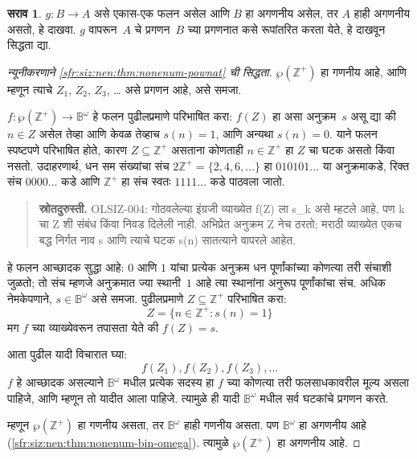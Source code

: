\documentclass[11pt,a4paper,openany]{book}
\theoremstyle{definition}
\newtheorem{prob}{सराव}[chapter]
\newcommand{\Setabs}[2]{\{#1:#2\}}
\newcommand{\Pow}[1]{\wp(#1)}
\newcommand{\PosInt}{\mathbb{Z}^{+}}
\newcommand{\Bin}{\mathbb{B}}
\begin{document}
\begin{prob}
$g\colon B \to A$ असे एकास-एक फलन असेल आणि $B$ हा
अगणनीय असेल, तर $A$ हाही अगणनीय असतो, हे दाखवा.
$g$ वापरून~$A$ चे प्रगणन~$B$ च्या प्रगणनात कसे रूपांतरित करता येते,
हे दाखवून सिद्धता द्या.
\end{prob}

\begin{proof}[न्यूनीकरणाने {\ref{sfr:siz:nen:thm:nonenum-pownat}} ची सिद्धता]
$\Pow{\PosInt}$ हा गणनीय आहे, आणि म्हणून त्याचे $Z_{1}$,
$Z_{2}$, $Z_{3}$, \dots{} असे प्रगणन आहे, असे समजा.

$f \colon \Pow{\PosInt} \to \Bin^\omega$ हे फलन पुढीलप्रमाणे परिभाषित
करा: $f(Z)$ हा असा अनुक्रम~$s$ असू द्या की $n \in Z$ असेल तेव्हा
आणि केवळ तेव्हाच $s(n) = 1$, आणि अन्यथा $s(n) = 0$. याने
फलन स्पष्टपणे परिभाषित होते, कारण $Z \subseteq \PosInt$ असताना कोणताही
$n \in \PosInt$ हा $Z$ चा घटक असतो किंवा नसतो. उदाहरणार्थ, धन सम संख्यांचा संच
$2\PosInt = \{2, 4, 6, \dots\}$ हा $010101\dots$ या अनुक्रमाकडे,
रिक्त संच $0000\dots$ कडे आणि $\PosInt$ हा संच स्वतः $1111\dots$ कडे
पाठवला जातो.
\begin{quote}\small\textbf{स्रोतदुरुस्ती.} OLSIZ-004: गोठवलेल्या इंग्रजी व्याख्येत f(Z) ला s\_k असे म्हटले आहे, पण k चा Z शी संबंध किंवा निवड दिलेली नाही. अभिप्रेत अनुक्रम Z नेच ठरतो; मराठी व्याख्येत एकच बद्ध निर्गत नाव s आणि त्याचे घटक s(n) सातत्याने वापरले आहेत.\end{quote}

हे फलन आच्छादक सुद्धा आहे: $0$ आणि $1$ यांचा प्रत्येक अनुक्रम धन
पूर्णांकांच्या कोणत्या तरी संचाशी जुळतो; तो संच म्हणजे अनुक्रमात ज्या
स्थानी~$1$ आहे त्या स्थानांना अनुरूप पूर्णांकांचा संच. अधिक नेमकेपणाने,
$s \in \Bin^\omega$ असे समजा. पुढीलप्रमाणे $Z \subseteq \PosInt$
परिभाषित करा:
\[
Z = \Setabs{n \in \PosInt}{s(n) = 1}
\]
मग $f$ च्या व्याख्येवरून तपासता येते की $f(Z) = s$.

आता पुढील यादी विचारात घ्या:
\[
f(Z_1), f(Z_2), f(Z_3), \dots
\]
$f$ हे आच्छादक असल्याने $\Bin^\omega$ मधील प्रत्येक सदस्य हा
$f$ च्या कोणत्या तरी फलसाधकावरील मूल्य असला पाहिजे, आणि म्हणून तो
यादीत आला पाहिजे. त्यामुळे ही यादी $\Bin^\omega$ मधील सर्व घटकांचे
प्रगणन करते.

म्हणून $\Pow{\PosInt}$ हा गणनीय असता, तर $\Bin^\omega$ हाही
गणनीय असता. पण $\Bin^\omega$ हा अगणनीय आहे
(\ref{sfr:siz:nen:thm:nonenum-bin-omega}). त्यामुळे $\Pow{\PosInt}$ हा
अगणनीय आहे.
\end{proof}
\end{document}
